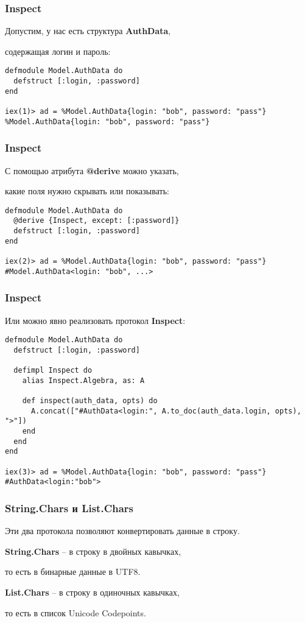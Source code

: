 \documentclass[10pt]{beamer}
\begin{document}
\begin{frame}[fragile]
  \frametitle{Inspect}
  Допустим, у нас есть структура \textbf{AuthData},
  \par \bigskip
  содержащая логин и пароль:
  \par \bigskip
  \begin{lstlisting}
defmodule Model.AuthData do
  defstruct [:login, :password]
end

iex(1)> ad = %Model.AuthData{login: "bob", password: "pass"}
%Model.AuthData{login: "bob", password: "pass"}
  \end{lstlisting}
\end{frame}

\begin{frame}[fragile]
  \frametitle{Inspect}
  С помощью атрибута \textbf{@derive} можно указать,
  \par \bigskip
  какие поля нужно скрывать или показывать:
  \par \bigskip
  \begin{lstlisting}
defmodule Model.AuthData do
  @derive {Inspect, except: [:password]}
  defstruct [:login, :password]
end

iex(2)> ad = %Model.AuthData{login: "bob", password: "pass"}
#Model.AuthData<login: "bob", ...>
  \end{lstlisting}
\end{frame}

\begin{frame}[fragile]
  \frametitle{Inspect}
  Или можно явно реализовать протокол \textbf{Inspect}:
  \par \bigskip
  \begin{lstlisting}
defmodule Model.AuthData do
  defstruct [:login, :password]

  defimpl Inspect do
    alias Inspect.Algebra, as: A

    def inspect(auth_data, opts) do
      A.concat(["#AuthData<login:", A.to_doc(auth_data.login, opts), ">"])
    end
  end
end

iex(3)> ad = %Model.AuthData{login: "bob", password: "pass"}
#AuthData<login:"bob">
  \end{lstlisting}
\end{frame}

\begin{frame}
  \frametitle{String.Chars и List.Chars}
  Эти два протокола позволяют конвертировать данные в строку.
  \par \bigskip
  \textbf{String.Chars} -- в строку в двойных кавычках,
  \par \bigskip
  то есть в бинарные данные в UTF8.
  \par \bigskip
  \textbf{List.Chars} -- в строку в одиночных кавычках,
  \par \bigskip
  то есть в список Unicode Codepoints.
\end{frame}
\end{document}

